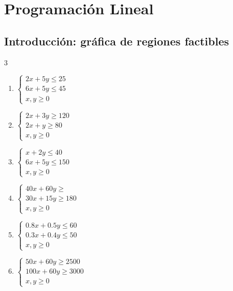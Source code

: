 
\section{Programaci\'on Lineal}

\subsection{Introducci\'on: gr\'afica de regiones factibles}


\begin{Ejer}
\begin{multicols}{3}
\begin{enumerate}
\item $\left\{
\begin{array}{c}
2x+5y\leq25\\
6x+5y\leq 45\\
x,y\geq0\end{array}
\right.$

\item $\left\{
\begin{array}{c}
2x+3y\geq120\\
2x+y\geq80\\
x,y\geq0\end{array}
\right.$

\item $\left\{
\begin{array}{c}
x+2y\leq40\\
6x+5y\leq150\\
x,y\geq0\end{array}
\right.$

\item $\left\{
\begin{array}{c}
40x+60y\geq\\
30x+15y\geq180\\
x,y\geq0\end{array}
\right.$

\item $\left\{
\begin{array}{c}
0.8x+0.5y\leq60\\
0.3x+0.4y\leq50\\
x,y\geq0\end{array}
\right.$

\item $\left\{
\begin{array}{c}
50x+60y\geq2500\\
100x+60y\geq3000\\
x,y\geq0\end{array}
\right.$


\end{enumerate}
\end{multicols}
\end{Ejer}
